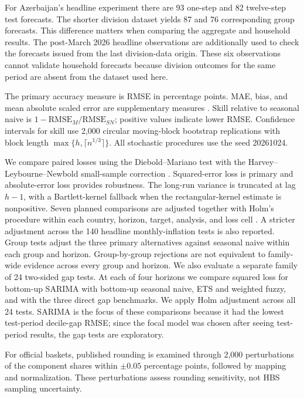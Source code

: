 \documentclass[11pt,a4paper]{article}
\begin{document}
For Azerbaijan's headline experiment there are 93 one-step and 82 twelve-step test forecasts. The shorter division dataset yields 87 and 76 corresponding group forecasts. This difference matters when comparing the aggregate and household results. The post-March 2026 headline observations are additionally used to check the forecasts issued from the last division-data origin. These six observations cannot validate household forecasts because division outcomes for the same period are absent from the dataset used here.

The primary accuracy measure is RMSE in percentage points. MAE, bias, and mean absolute scaled error are supplementary measures \citep{hyndman2006}. Skill relative to seasonal naive is $1-\mathrm{RMSE}_{M}/\mathrm{RMSE}_{SN}$; positive values indicate lower RMSE. Confidence intervals for skill use 2,000 circular moving-block bootstrap replications with block length $\max\{h,\lceil n^{1/3}\rceil\}$. All stochastic procedures use the seed 20261024.

We compare paired losses using the Diebold--Mariano test with the Harvey--Leybourne--Newbold small-sample correction \citep{diebold1995,harvey1997}. Squared-error loss is primary and absolute-error loss provides robustness. The long-run variance is truncated at lag $h-1$, with a Bartlett-kernel fallback when the rectangular-kernel estimate is nonpositive. Seven planned comparisons are adjusted together with Holm's procedure within each country, horizon, target, analysis, and loss cell \citep{holm1979}. A stricter adjustment across the 140 headline monthly-inflation tests is also reported. Group tests adjust the three primary alternatives against seasonal naive within each group and horizon. Group-by-group rejections are not equivalent to family-wide evidence across every group and horizon. We also evaluate a separate family of 24 two-sided gap tests. At each of four horizons we compare squared loss for bottom-up SARIMA with bottom-up seasonal naive, ETS and weighted fuzzy, and with the three direct gap benchmarks. We apply Holm adjustment across all 24 tests. SARIMA is the focus of these comparisons because it had the lowest test-period decile-gap RMSE; since the focal model was chosen after seeing test-period results, the gap tests are exploratory.

For official baskets, published rounding is examined through 2,000 perturbations of the component shares within $\pm0.05$ percentage points, followed by mapping and normalization. These perturbations assess rounding sensitivity, not HBS sampling uncertainty.
\end{document}
